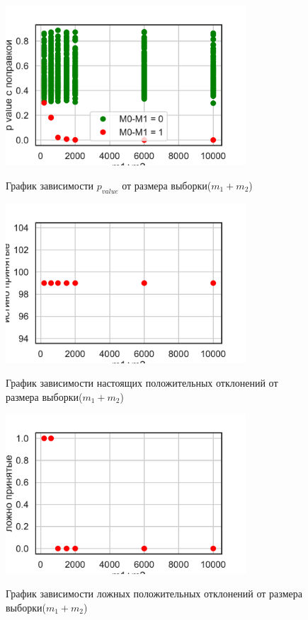 \documentclass[12pt, twoside]{article}
\begin{document}
\begin{figure}[h!]\center
{\includegraphics[width=0.8\textwidth]{forth_p}}
\caption{График зависимости $p_{value}$ от размера выборки($m_1+m_2$)}
\label{forth_p}
\end{figure}
\begin{figure}[h!]\center
{\includegraphics[width=0.8\textwidth]{forth_TP}}
\caption{График зависимости настоящих положительных отклонений от размера выборки($m_1+m_2$)}
\label{forth_TP}
\end{figure}
\begin{figure}[h!]\center
{\includegraphics[width=0.8\textwidth]{forth_FP}}
\caption{График зависимости ложных положительных отклонений от размера выборки($m_1+m_2$)}
\label{forth_FP}
\end{figure}
\end{document}
